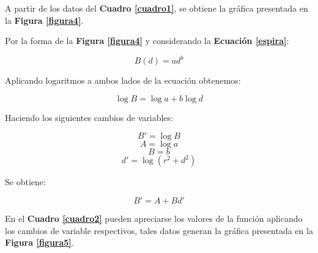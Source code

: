 \documentclass[letter,11pt]{article}
\begin{document}
A partir de los datos del \textbf{Cuadro \ref{cuadro1}}, se obtiene la gráfica
presentada en la \textbf{Figura \ref{figura4}}.

Por la forma de la \textbf{Figura \ref{figura4}} y considerando la
\textbf{Ecuación \ref{espira}}:

\begin{equation*}
    B(d) = a d^b
\end{equation*}

Aplicando logaritmos a ambos lados de la ecuación obtenemos:

\begin{equation*}
    \log B = \log a + b \log d
\end{equation*}

Haciendo los siguientes cambios de variables:

\begin{equation*}
    B' = \log B
\end{equation*}
\begin{equation*}
    A = \log a
\end{equation*}
\begin{equation*}
    B = b
\end{equation*}
\begin{equation*}
    d' = \log (r^2+d^2)
\end{equation*}

Se obtiene:

\begin{equation*}
    B' = A + B d'
\end{equation*}

En el \textbf{Cuadro \ref{cuadro2}} pueden apreciarse los valores de la función
aplicando los cambios de variable respectivos, tales datos generan la gráfica
presentada en la \textbf{Figura \ref{figura5}}.
\end{document}
